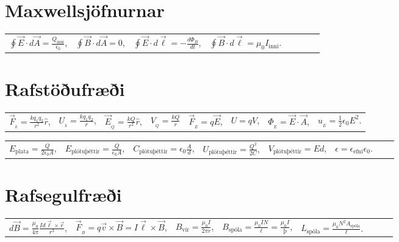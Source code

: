 \section*{Maxwellsjöfnurnar}

\begin{table}[H]
\begin{tabular}{llllllll}
$ \displaystyle\oint \vec{E} \cdot d\vec{A} = \frac{Q_{\text{inni}}}{\epsilon_0}$, & $\displaystyle\oint \vec{B} \cdot d\vec{A} = 0$, & $\displaystyle\oint \vec{E} \cdot d\vec{\ell} = - \frac{d\Phi_B}{dt}$, & $ \displaystyle\oint \vec{B} \cdot d\vec{\ell} = \mu_0 I_{\text{inni}}$.
\end{tabular}
\end{table}

\section*{Rafstöðufræði}


\begin{table}[H]
\begin{tabular}{llllllll}
$\displaystyle\vec{F}_{\!_k} = \frac{kq_1 q_2}{r^2}\hat{r}$, & $\displaystyle U_{\!_k} = \frac{kq_1 q_2}{r}$, & $\displaystyle \vec{E}_{\!_Q} = \frac{kQ}{r^2}\hat{r}$, & $\displaystyle V_{\!_Q} = \frac{kQ}{r}$ & $\vec{F}_{\!_E} = q\vec{E}$, & $U = qV$, & $\Phi_{\!_E} = \vec{E} \cdot \vec{A}$, & $u_{\!_E} = \frac{1}{2}\epsilon_0 E^2$.
\end{tabular}
\end{table}

\begin{table}[H]
\begin{tabular}{llllllll}
$\displaystyle E_{\text{plata}} = \frac{Q}{2 \epsilon_0 A}$, & $\displaystyle E_{\text{plötuþéttir}} = \frac{Q}{\epsilon_0 A}$, & $\displaystyle C_{\text{plötuþéttir}} = \epsilon_0 \frac{A}{d}$, & $U_{\text{plötuþéttir}} = \frac{Q^2}{2C}$, & $\displaystyle V_{\text{plötuþéttir}} = Ed$, & $\epsilon = \epsilon_{\text{efni}} \epsilon_0$. 
\end{tabular}
\end{table}

\section*{Rafsegulfræði}

\begin{table}[H]
\begin{tabular}{llllllll}
$\displaystyle d\Vec{B} = \frac{\mu_0}{4\pi} \frac{I d\Vec{\ell} \times \Vec{r}}{r^3}$, & $\vec{F}_{\!_B} = q\Vec{v}\times \Vec{B} = I \Vec{\ell} \times \Vec{B}$, & $\displaystyle B_{\text{vír}} = \frac{\mu_0 I}{2\pi r}$, & $\displaystyle B_{\text{spóla}} = \frac{\mu_0 I N}{\ell} = \frac{\mu_0 I}{þ}$, & $\displaystyle L_{\text{spóla}} = \frac{\mu_0 N^2 A_{\text{spóla}}}{\ell}$.
\end{tabular}
\end{table}

